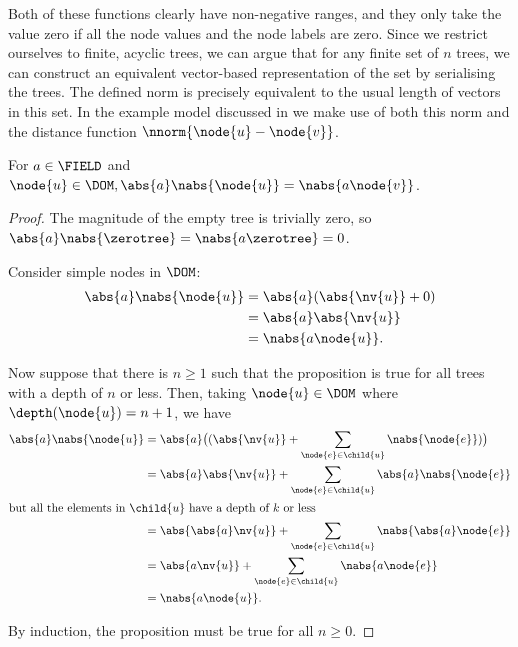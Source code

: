 Both of these functions clearly have non-negative ranges, and they
only take the value zero if all the node values and the node labels
are zero.  Since we restrict ourselves to finite, acyclic trees, we
can argue that for any finite set of $n$ trees, we can construct an
equivalent vector-based representation of the set by serialising the trees.
The defined norm is precisely equivalent to the usual length
of vectors in this set.
In the example model discussed in \Cfive we 
make use of both this norm and the distance function
$\nnorm{\node{u}-\node{v}}$.

\begin{proposition}\label{absolutehomogeneity}
  For \(a \in \FIELD\) and \(\node{u} \in \DOM, \abs{a}\nabs{\node{u}} =
  \nabs{a \node{v}}\).
\begin{proof}
  The magnitude of the empty tree is trivially zero, so \(\abs{a}\nabs{\zerotree} =
  \nabs{a\zerotree} = 0\).

  Consider simple nodes in $\DOM$:
  \begin{align*}
      \abs{a}\nabs{\node{u}} &= \abs{a}(\abs{\nv{u}} + 0) \\
      &= \abs{a}\abs{\nv{u}} \\
      &= \nabs{a \node{u}}.
  \end{align*}

  Now suppose that there is \(n \ge 1\) such that the proposition is true for
  all trees with a depth of \(n\) or less. Then, taking \(\node{u} \in
  \DOM\) where \(\depth(\node{u}) = n+1\), we have
  \begin{align*}
      \abs{a}\nabs{\node{u}} &= \abs{a}\bigl((\abs{\nv{u}} + \sum_{\node{e}\in\child{u}}\nabs{\node{e}})\bigr) \\
      &= \abs{a}\abs{\nv{u}} + \sum_{\node{e}\in\child{u}}\abs{a}\nabs{\node{e}}\\
      \intertext{but all the elements in \(\child{u}\) have a depth of \(k\) or less}
      &= \abs{\abs{a}\nv{u}} + \sum_{\node{e}\in\child{u}}\nabs{\abs{a}\node{e}} \\
      &= \abs{a\nv{u}} + \sum_{\node{e}\in\child{u}}\nabs{a \node{e}} \\
      &= \nabs{a \node{u}}.
  \end{align*}

  By induction, the proposition must be true for all \(n \geq 0\).
\end{proof}
\end{proposition}


